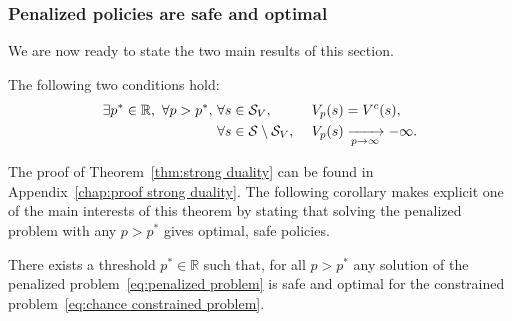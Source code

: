 \subsubsection{Penalized policies are safe and optimal}
We are now ready to state the two main results of this section.
\begin{theorem} \label{thm:strong duality}
	The following two conditions hold:
	\begin{alignat}{3}
		\exists p^*\in\mathbb{R},~\forall p > p^*,~&\forall s\in{\ensuremath{\mathcal{S}}_{V}},&~&V_p(s) = V^c(s),\label{eq:strong duality sv}\\
		&\forall s\in\mathcal{S}\setminus{\ensuremath{\mathcal{S}}_{V}},&~&V_p(s)\xrightarrow[p\to\infty]{}-\infty. \label{eq:strong duality su}
	\end{alignat}
\end{theorem}
The proof of Theorem~\ref{thm:strong duality} can be found in Appendix~\ref{chap:proof strong duality}. The following corollary makes explicit one of the main interests of this theorem by stating that solving the penalized problem with any $p > p^*$ gives optimal, safe policies.
\begin{corollary} \label{clry:penalized solves constrained}
	There exists a threshold $p^*\in\mathbb{R}$ such that, for all $p > p^*$ any solution of the penalized problem~\eqref{eq:penalized problem} is safe and optimal for the constrained problem~\eqref{eq:chance constrained problem}.
\end{corollary}
